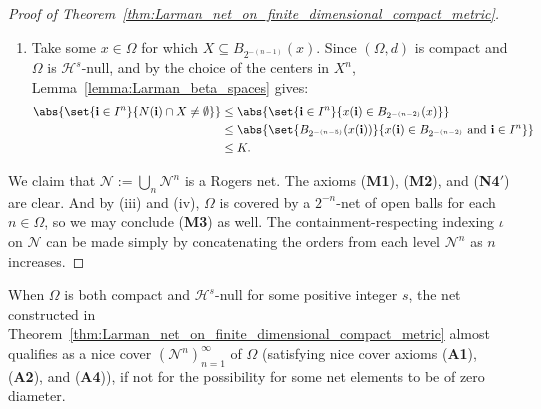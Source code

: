 \begin{proof}[Proof of Theorem~\ref{thm:Larman_net_on_finite_dimensional_compact_metric}]
\begin{enumerate}[label=(\roman*)]
        \item Take some $x \in \Omega$ for which $X \subseteq B_{2^{-(n - 1)}}(x)$. Since $(\Omega, d)$ is compact and $\Omega$ is $\mathcal{H}^s$-null, and by the choice of the centers in $X^n$, Lemma~\ref{lemma:Larman_beta_spaces} gives:
        \begin{align*}
            \abs{\set{\mathbf{i} \in I^n}{N(\mathbf{i}) \cap X \neq \emptyset}} & \leq \abs{\set{\mathbf{i} \in I^n}{x(\mathbf{i}) \in B_{2^{-(n - 2)}}(x)}}\\
            &\leq \abs{\set{B_{2^{-(n - 5)}}(x(\mathbf{i}))}{x(\mathbf{i}) \in B_{2^{-(n - 2)}} \text{ and } \mathbf{i} \in I^n}}\\
            &\leq K.
        \end{align*}
    \end{enumerate}
    We claim that $\mathcal{N} := \bigcup_{n} \mathcal{N}^n$ is a Rogers net. The axioms (\textbf{M1}), (\textbf{M2}), and (\textbf{N4}$'$) are clear. And by (iii) and (iv), $\Omega$ is covered by a $2^{-n}$-net of open balls for each $n \in \Omega$, so we may conclude (\textbf{M3}) as well. The containment-respecting indexing $\iota$ on $\mathcal{N}$ can be made simply by concatenating the orders from each level $\mathcal{N}^n$ as $n$ increases.
\end{proof}

When $\Omega$ is both compact and $\mathcal{H}^s$-null for some positive integer $s$, the net constructed in Theorem~\ref{thm:Larman_net_on_finite_dimensional_compact_metric} almost qualifies as a nice cover $(\mathcal{N}^{n})_{n = 1}^\infty$ of $\Omega$ (satisfying nice cover axioms (\textbf{A1}), (\textbf{A2}), and (\textbf{A4})), if not for the possibility for some net elements to be of zero diameter. 


